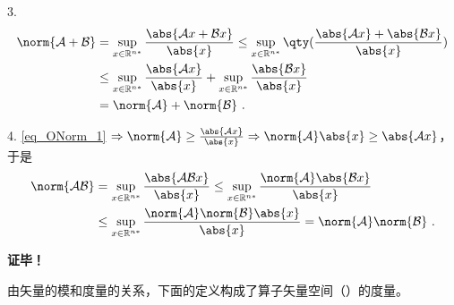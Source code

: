 3.\begin{equation}
\begin{aligned}
\norm{\mathcal A+\mathcal B}&=\sup\limits_{x\in{\mathbb R^{n*}}}\frac{\abs{\mathcal Ax+\mathcal B x}}{\abs{x}}\leq\sup\limits_{x\in{\mathbb R^{n*}}}\qty(\frac{\abs{\mathcal Ax}+\abs{\mathcal B x}}{\abs{x}})\\
&\leq \sup\limits_{x\in{\mathbb R^{n*}}}\frac{\abs{ \mathcal Ax}}{\abs{x}}+\sup\limits_{x\in{\mathbb R^{n*}}}\frac{\abs{\mathcal B x}}{\abs{x}}\\
&=\norm{\mathcal A}+\norm{\mathcal B}~.
\end{aligned}
\end{equation}

4. \autoref{eq_ONorm_1} $\Rightarrow\norm{\mathcal A}\geq\frac{\abs{\mathcal Ax}}{\abs{x}}\Rightarrow \norm{\mathcal A}\abs{x}\geq\abs{\mathcal A x}$，于是
\begin{equation}
\begin{aligned}
\norm{\mathcal{AB}}&=\sup\limits_{x\in{\mathbb R^{n*}}}\frac{\abs{\mathcal{AB} x}}{\abs{x}}\leq\sup\limits_{x\in{\mathbb R^{n*}}}\frac{\norm{\mathcal A}\abs{\mathcal{B} x}}{\abs{x}}\\
&\leq\sup\limits_{x\in{\mathbb R^{n*}}}\frac{\norm{\mathcal A}\norm{\mathcal B}\abs{x}}{\abs{x}}=\norm{\mathcal A}\norm{\mathcal B}~.
\end{aligned}
\end{equation}

\textbf{证毕！}

由矢量的模和度量的关系，下面的定义构成了算子矢量空间（）的度量。

\begin{theorem}{}

\end{theorem}